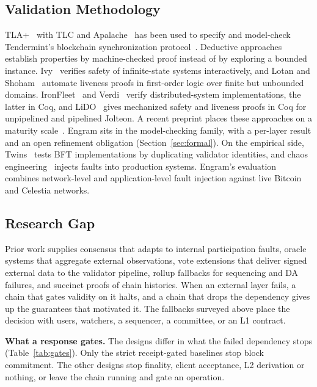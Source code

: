 \subsection{Validation Methodology}
\label{subsec:rw-validation}
TLA+~\cite{lamport2002specifying} with TLC and
Apalache~\cite{konnov2019apalache} has been used to specify and model-check
Tendermint's blockchain synchronization protocol~\cite{braithwaite2020tendermint}. Deductive approaches establish properties by machine-checked proof instead of
by exploring a bounded instance. Ivy~\cite{padon2016ivy} verifies safety of
infinite-state systems interactively, and Lotan and
Shoham~\cite{lotan2025implicit} automate liveness proofs in first-order logic
over finite but unbounded domains. IronFleet~\cite{hawblitzel2015ironfleet} and
Verdi~\cite{wilcox2015verdi} verify distributed-system implementations, the
latter in Coq, and LiDO~\cite{qiu2024lido} gives mechanized safety and
liveness proofs in Coq for unpipelined and pipelined Jolteon. A recent
preprint places these approaches on a maturity
scale~\cite{bondarev2026sok}. Engram sits in the model-checking family, with a
per-layer result and an open refinement obligation
(Section~\ref{sec:formal}). On the empirical side, Twins~\cite{bano2021twins}
tests BFT implementations by duplicating validator identities, and chaos
engineering~\cite{basiri2016chaos} injects faults into production systems.
Engram's evaluation combines network-level and application-level fault
injection against live Bitcoin and Celestia networks.

\subsection{Research Gap}
\label{subsec:rw-gap}
Prior work supplies consensus that adapts to internal participation faults,
oracle systems that aggregate external observations, vote extensions that
deliver signed external data to the validator pipeline, rollup fallbacks for
sequencing and DA failures, and succinct proofs of chain histories. When an
external layer fails, a chain that gates validity on it halts, and a chain
that drops the dependency gives up the guarantees that motivated it. The
fallbacks surveyed above place the decision with users, watchers, a sequencer,
a committee, or an L1 contract.

\textbf{What a response gates.} The designs differ in what the failed
dependency stops (Table~\ref{tab:gates}). Only the strict receipt-gated baselines
stop block commitment. The other designs stop finality, client acceptance, L2
derivation or nothing, or leave the chain running and gate an operation.

